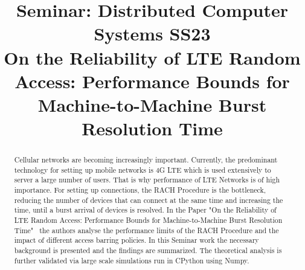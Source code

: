 \documentclass[conference]{IEEEtran}
\begin{document}
\title{Seminar: Distributed Computer Systems SS23\\
{\footnotesize On the Reliability of LTE Random Access: Performance Bounds for Machine-to-Machine Burst Resolution Time}}



\author{
}
\maketitle

\begin{abstract}
    Cellular networks are becoming increasingly important.
    Currently, the predominant technology for setting up mobile networks is 4G LTE which is used extensively to server a large number of users.
    That is why performance of LTE Networks is of high importance.
    For setting up connections, the RACH Procedure is the bottleneck, reducing the number of devices that can connect at the same time and increasing the time, until a burst arrival of devices is resolved.
    In the Paper "On the Reliability of LTE Random Access: Performance Bounds for Machine-to-Machine Burst Resolution Time"~\cite{8422323} the authors analyse the performance limits of the RACH Procedure and the impact of different access barring policies.
    In this Seminar work the necessary background is presented and the findings are summarized.
    The theoretical analysis is further validated via large scale simulations run in CPython using Numpy.
\end{abstract}
\end{document}
